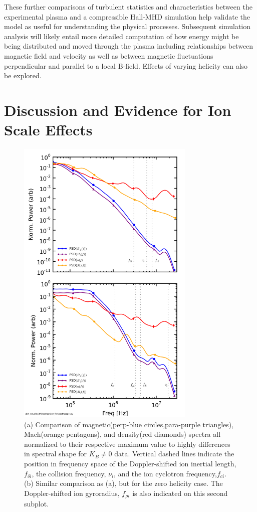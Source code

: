 \documentclass[aip,prl,amsmath,amssymb,reprint,superscriptaddress]{revtex4-1} %
\begin{document}
These further comparisons of turbulent statistics and characteristics between the experimental plasma and a compressible Hall-MHD simulation help validate the model as useful for understanding the physical processes. Subsequent simulation analysis will likely entail more detailed computation of how energy might be being distributed and moved through the plasma including relationships between magnetic field and velocity as well as between magnetic fluctuations perpendicular and parallel to a local B-field. Effects of varying helicity can also be explored.

\section{Discussion and Evidence for Ion Scale Effects}\label{sec:ionscale}

\begin{figure}[!htbp]
\centerline{
\includegraphics[width=8.5cm]{BvsDensvsFlowspec_1mWb_and_0mWbcomp_40t60us}}
\caption{\label{fig:BMD_comp} (a) Comparison of magnetic(perp-blue circles,para-purple triangles), Mach(orange pentagons), and density(red diamonds) spectra all normalized to their respective maximum value to highly differences in spectral shape for $K_{B}\neq 0$ data. Vertical dashed lines indicate the position in frequency space of the Doppler-shifted ion inertial length, $f_{\delta i}$, the collision frequency, $\nu_i$, and the ion cyclotron frequency,$f_{ci}$. (b) Similar comparison as (a), but for the zero helicity case. The Doppler-shifted ion gyroradius, $f_{\rho i}$ is also indicated on this second subplot.}
\end{figure}
\end{document}
